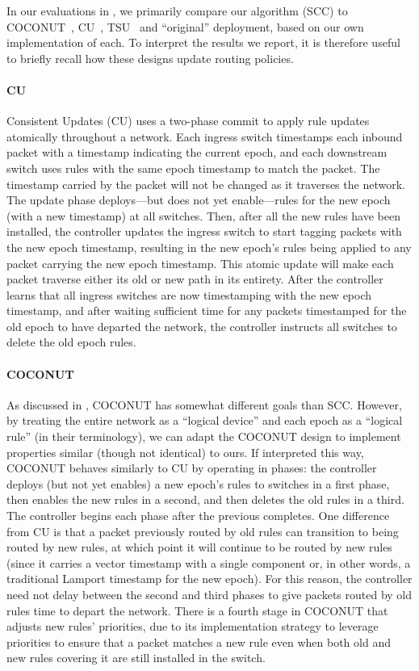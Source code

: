 In our evaluations in ,
we primarily compare our algorithm (SCC) to COCONUT~\cite{COCONUT},
CU~\cite{CU}, TSU~\cite{tsu} and ``original'' deployment, based on our own implementation of
each.  To interpret the results we report, it is therefore useful to
briefly recall how these designs update routing policies.

\paragraph{CU}
Consistent Updates (CU) uses a two-phase commit to apply rule updates
atomically throughout a network.  Each ingress switch timestamps each
inbound packet with a timestamp indicating the current epoch, and each
downstream switch uses rules with the same epoch timestamp to match
the packet. The timestamp carried by the packet will not be changed as
it traverses the network.  The update phase deploys---but does not yet
enable---rules for the new epoch (with a new timestamp) at all
switches. Then, after all the new rules have been installed, the
controller updates the ingress switch to start tagging packets with
the new epoch timestamp, resulting in the new epoch's rules being
applied to any packet carrying the new epoch timestamp.  This atomic
update will make each packet traverse either its old or new path in
its entirety.  After the controller learns that all ingress switches
are now timestamping with the new epoch timestamp, and after waiting
sufficient time for any packets timestamped for the old epoch to have
departed the network, the controller instructs all switches to delete
the old epoch rules.

\paragraph{COCONUT}
As discussed in , COCONUT has somewhat different
goals than SCC.  However, by treating the entire network as a
``logical device'' and each epoch as a ``logical rule'' (in their
terminology), we can adapt the COCONUT design to implement properties
similar (though not identical) to ours.  If interpreted this way,
COCONUT behaves similarly to CU by operating in phases: the controller
deploys (but not yet enables) a new epoch's rules to switches in a
first phase, then enables the new rules in a second, and then deletes
the old rules in a third.  The controller begins each phase after the
previous completes.  One difference from CU is that a packet
previously routed by old rules can transition to being routed by new
rules, at which point it will continue to be routed by new rules
(since it carries a vector timestamp with a single component or, in
other words, a traditional Lamport timestamp for the new epoch).  For
this reason, the controller need not delay between the second and
third phases to give packets routed by old rules time to depart the
network.  There is a fourth stage in COCONUT that adjusts new rules'
priorities, due to its implementation strategy to leverage priorities
to ensure that a packet matches a new rule even when both old and new
rules covering it are still installed in the switch.

